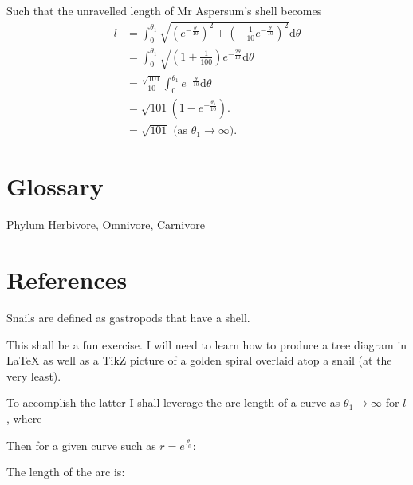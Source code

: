 \documentclass[twoside]{article}
\begin{document}
\begin{multicols}{2}
\begin{flushleft}
\begin{minipage}{0.5\textwidth}
        Such that the unravelled length of Mr Aspersum's shell becomes 
        \begin{align*}
            l &= \int^{\theta_1}_{0} \sqrt{(e^{-\frac{\theta}{10}})^2 + (-\frac{1}{10}e^{-\frac{\theta}{10}})^2}\mathrm{d}\theta\\
            &= \int^{\theta_1}_{0} \sqrt{(1+\frac{1}{100})e^{-\frac{2\theta}{10}}} \mathrm{d}\theta\\
            &= \frac{\sqrt{101}}{10} \int^{\theta_1}_0 e^{-\frac{\theta}{10}}\mathrm{d}\theta\\
            &= \sqrt{101}(1 - e^{-\frac{\theta_1}{10}}).\\
            &= \sqrt{101} \text{ (as \(\theta_1 \rightarrow \infty\)).}
        \end{align*}

    \end{minipage}
    \end{flushleft}

\end{multicols}

\section*{Glossary}
Phylum
Herbivore, Omnivore, Carnivore
\section*{References}



Snails are defined as gastropods that have a shell. 

This shall be a fun exercise. I will need to learn how to produce a tree diagram in \LaTeX{} as well as a TikZ picture of a golden spiral overlaid atop a snail (at the very least).

To accomplish the latter I shall leverage the arc length of a curve as \(\theta_1 \rightarrow \infty\) for \(l\), where


Then for a given curve such as \(r = e^\frac{\theta}{10}\):

The length of the arc is:
\end{document}
